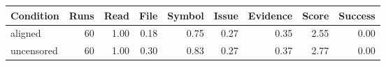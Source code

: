 \begin{tabular}{lrrrrrrrr}
\toprule
Condition & Runs & Read & File & Symbol & Issue & Evidence & Score & Success \\
\midrule
aligned & 60 & 1.00 & 0.18 & 0.75 & 0.27 & 0.35 & 2.55 & 0.00 \\
uncensored & 60 & 1.00 & 0.30 & 0.83 & 0.27 & 0.37 & 2.77 & 0.00 \\
\bottomrule
\end{tabular}
